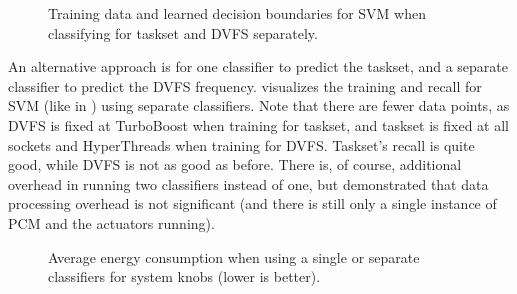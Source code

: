 \begin{figure}[t]
  \centering
  \hspace*{0.1cm}
\caption{Training data and learned decision boundaries for SVM when classifying for taskset and DVFS separately.}
\label{fig:feat-space-svm-separate}
\end{figure}

An alternative approach is for one classifier to predict the taskset, and a separate classifier to predict the DVFS frequency.
 visualizes the training and recall for SVM (like  in ) using separate classifiers.
Note that there are fewer data points, as DVFS is fixed at TurboBoost when training for taskset, and taskset is fixed at all sockets and HyperThreads when training for DVFS.
Taskset's recall is quite good, while DVFS is not as good as before.
There is, of course, additional overhead in running two classifiers instead of one, but  demonstrated that data processing overhead is not significant (and there is still only a single instance of PCM and the actuators running).

\begin{figure}[t]
  \centering
  
  \caption{Average energy consumption when using a single or separate classifiers for system knobs (lower is better).}
  \label{fig:separate-clfs}
\end{figure}

